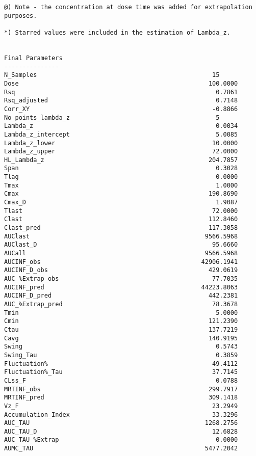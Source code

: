 \documentclass[12pt,a4paper]{article}
\begin{document}
\begin{verbatim}
@) Note - the concentration at dose time was added for extrapolation purposes.

*) Starred values were included in the estimation of Lambda_z.


Final Parameters
---------------
N_Samples                                                15
Dose                                                    100.0000
Rsq                                                       0.7861
Rsq_adjusted                                              0.7148
Corr_XY                                                  -0.8866
No_points_lambda_z                                        5
Lambda_z                                                  0.0034
Lambda_z_intercept                                        5.0085
Lambda_z_lower                                           10.0000
Lambda_z_upper                                           72.0000
HL_Lambda_z                                             204.7857
Span                                                      0.3028
Tlag                                                      0.0000
Tmax                                                      1.0000
Cmax                                                    190.8690
Cmax_D                                                    1.9087
Tlast                                                    72.0000
Clast                                                   112.8460
Clast_pred                                              117.3058
AUClast                                                9566.5968
AUClast_D                                                95.6660
AUCall                                                 9566.5968
AUCINF_obs                                            42906.1941
AUCINF_D_obs                                            429.0619
AUC_%Extrap_obs                                          77.7035
AUCINF_pred                                           44223.8063
AUCINF_D_pred                                           442.2381
AUC_%Extrap_pred                                         78.3678
Tmin                                                      5.0000
Cmin                                                    121.2390
Ctau                                                    137.7219
Cavg                                                    140.9195
Swing                                                     0.5743
Swing_Tau                                                 0.3859
Fluctuation%                                             49.4112
Fluctuation%_Tau                                         37.7145
CLss_F                                                    0.0788
MRTINF_obs                                              299.7917
MRTINF_pred                                             309.1418
Vz_F                                                     23.2949
Accumulation_Index                                       33.3296
AUC_TAU                                                1268.2756
AUC_TAU_D                                                12.6828
AUC_TAU_%Extrap                                           0.0000
AUMC_TAU                                               5477.2042




\end{verbatim}
\end{document}
